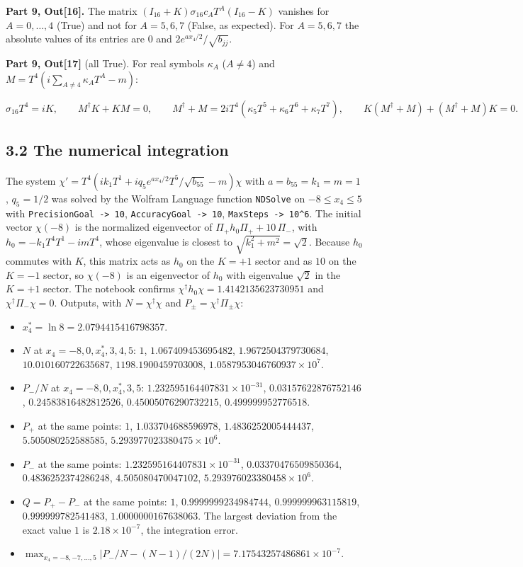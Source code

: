 \documentclass[10pt]{article}
\makeatletter
\newcommand\keepnext{\par\nopagebreak\@nobreaktrue\everypar{\@nobreakfalse\everypar{}}}
\makeatother
\begin{document}
\textbf{Part 9, Out[16].} The matrix $(I_{16} + K)\sigma_{16}c_AT^A(I_{16} - K)$ vanishes for $A = 0, \dots, 4$ (True) and not for $A = 5, 6, 7$ (False, as expected). For $A = 5, 6, 7$ the absolute values of its entries are $0$ and $2e^{ax_4/2}/\sqrt{b_{jj}}$.


\textbf{Part 9, Out[17]} (all True). For real symbols $\kappa_A$ ($A \ne 4$) and $M = T^4(i\sum_{A\ne4}\kappa_AT^A - m)$:\keepnext


\[
\sigma_{16}T^4 = iK, \qquad M^\dagger K + KM = 0, \qquad M^\dagger + M = 2iT^4(\kappa_5T^5 + \kappa_6T^6 + \kappa_7T^7), \qquad K(M^\dagger + M) + (M^\dagger + M)K = 0 .
\]

\subsection*{3.2 The numerical integration}

The system $\chi' = T^4(ik_1T^1 + iq_5e^{ax_4/2}T^5/\sqrt{b_{55}} - m)\chi$ with $a = b_{55} = k_1 = m = 1$, $q_5 = 1/2$ was solved by the Wolfram Language function \texttt{NDSolve} on $-8 \le x_4 \le 5$ with \texttt{PrecisionGoal -\textgreater{} 10}, \texttt{AccuracyGoal -\textgreater{} 10}, \texttt{MaxSteps -\textgreater{} 10\^{}6}. The initial vector $\chi(-8)$ is the normalized eigenvector of $\Pi_+h_0\Pi_+ + 10\,\Pi_-$, with $h_0 = -k_1T^4T^1 - imT^4$, whose eigenvalue is closest to $\sqrt{k_1^2 + m^2} = \sqrt2$. Because $h_0$ commutes with $K$, this matrix acts as $h_0$ on the $K = +1$ sector and as $10$ on the $K = -1$ sector, so $\chi(-8)$ is an eigenvector of $h_0$ with eigenvalue $\sqrt2$ in the $K = +1$ sector. The notebook confirms $\chi^\dagger h_0\chi = 1.4142135623730951$ and $\chi^\dagger\Pi_-\chi = 0$. Outputs, with $N = \chi^\dagger\chi$ and $P_\pm = \chi^\dagger\Pi_\pm\chi$:\keepnext


\begin{itemize}
\item $x_4^* = \ln 8 = 2.0794415416798357$.
\item $N$ at $x_4 = -8, 0, x_4^*, 3, 4, 5$: $1$, $1.067409453695482$, $1.9672504379730684$, $10.010160722635687$, $1198.1900459703008$, $1.0587953046760937\times10^{7}$.
\item $P_-/N$ at $x_4 = -8, 0, x_4^*, 3, 5$: $1.232595164407831\times10^{-31}$, $0.03157622876752146$, $0.24583816482812526$, $0.45005076290732215$, $0.499999952776518$.
\item $P_+$ at the same points: $1$, $1.033704688596978$, $1.4836252005444437$, $5.505080252588585$, $5.293977023380475\times10^{6}$.
\item $P_-$ at the same points: $1.232595164407831\times10^{-31}$, $0.03370476509850364$, $0.4836252374286248$, $4.505080470047102$, $5.293976023380458\times10^{6}$.
\item $Q = P_+ - P_-$ at the same points: $1$, $0.9999999234984744$, $0.999999963115819$, $0.999999782541483$, $1.0000000167638063$. The largest deviation from the exact value $1$ is $2.18\times10^{-7}$, the integration error.
\item $\max_{x_4 = -8, -7, \dots, 5}\lvert P_-/N - (N - 1)/(2N)\rvert = 7.17543257486861\times10^{-7}$.
\end{itemize}
\end{document}
